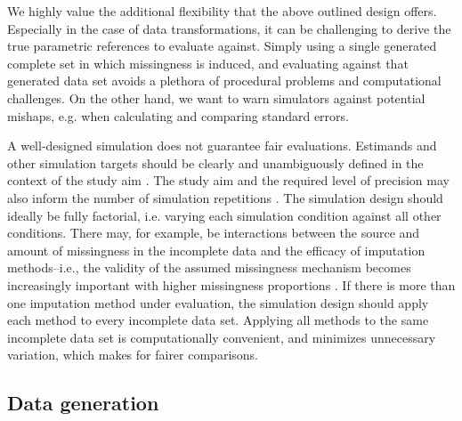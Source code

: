 \documentclass[bimj,fleqn]{w-art}
\begin{document}
We highly value the additional flexibility that the above outlined design offers. Especially in the case of data transformations, it can be challenging to derive the true parametric references to evaluate against. Simply using a single generated complete set in which missingness is induced, and evaluating against that generated data set avoids a plethora of procedural problems and computational challenges. On the other hand, we want to warn simulators against potential mishaps, e.g. when calculating and comparing standard errors.

A well-designed simulation does not guarantee fair evaluations. Estimands and other simulation targets should be clearly and unambiguously defined in the context of the study aim \citep{pete14}. The study aim and the required level of precision may also inform the number of simulation repetitions \citep[e.g. as determined from a maximum tolerable level of uncertainty in terms of a performance measure's Monte Carlo error; see][]{morr18}. The simulation design should ideally be fully factorial, i.e. varying each simulation condition against all other conditions. There may, for example, be interactions between the source and amount of missingness in the incomplete data and the efficacy of imputation methods--i.e., the validity of the assumed missingness mechanism becomes increasingly important with higher missingness proportions \citep{scho18}. If there is more than one imputation method under evaluation, the simulation design should apply each method to every incomplete data set. Applying all methods to the same incomplete data set is computationally convenient, and minimizes unnecessary variation, which makes for fairer comparisons.


\subsection{Data generation}
\end{document}
